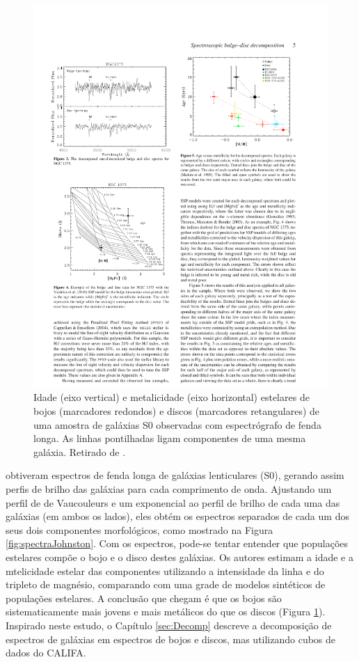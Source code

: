 \begin{figure}
	\includegraphics{figuras/johnston-pop}
	\caption[Idade e metalicidade de bojos e discos de galáxias S0.] {Idade (eixo
	vertical) e metalicidade (eixo horizontal) estelares de bojos (marcadores
	redondos) e discos (marcadores retangulares) de uma amostra de galáxias S0
	observadas com espectrógrafo de fenda longa. As linhas pontilhadas ligam
	componentes de uma mesma galáxia. Retirado de \citet{Johnston2012}.}
	\label{fig:populationJohnston}
\end{figure}

\citet{Johnston2012} obtiveram espectros de fenda longa de galáxias lenticulares
(S0), gerando assim perfis de brilho das galáxias para cada comprimento de onda.
Ajustando um perfil de de Vaucouleurs e um exponencial ao perfil de brilho de
cada uma das galáxias (em ambos os lados), eles obtém os espectros separados de
cada um dos seus dois componentes morfológicos, como mostrado na Figura
\ref{fig:spectraJohnston}. Com os espectros, pode-se tentar entender que
populações estelares compõe o bojo e o disco destes galáxias. Os autores estimam
a idade e a mtelicidade estelar das componentes utilizando a intensidade da
linha \Hbeta e do tripleto de magnésio, comparando com uma grade de modelos
sintéticos de populações estelares. A conclusão que chegam é que os bojos são
sistematicamente mais jovens e mais metálicos do que os discos (Figura
\ref{fig:populationJohnston}). Inspirado neste estudo, o Capítulo
\ref{sec:Decomp} descreve a decomposição de espectros de galáxias em espectros
de bojos e discos, mas utilizando cubos de dados do CALIFA.


